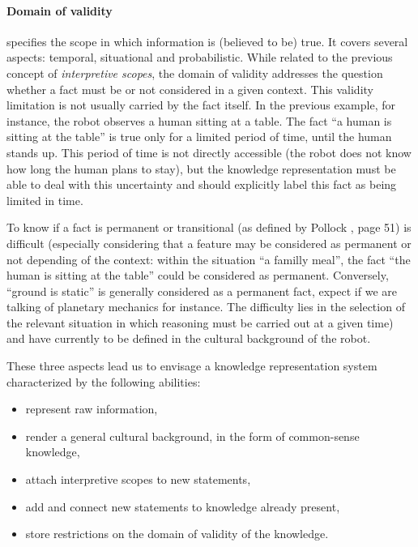 \paragraph{Domain of validity} specifies the scope in which
 information is (believed to be) true. It covers several aspects: temporal,
situational and probabilistic. While related to the previous concept of
\emph{interpretive scopes}, the domain of validity addresses the question
whether a fact must be or not considered in a given context. This validity
limitation is not usually carried by the fact itself. In the previous example,
for instance, the robot observes a human sitting at a table.  The fact ``a
human is sitting at the table'' is true only for a limited period of time,
until the human stands up. This period of time is not directly accessible
(the robot does not know how long the human plans to stay), but the
knowledge representation must be able to deal with this uncertainty and
should explicitly label this fact as being limited in time.

To know if a fact is permanent or transitional (as defined by Pollock
\cite{Pollock1998}, page 51) is difficult (especially
considering that a feature may be considered as permanent or not depending of
the context: within the situation ``a familly meal'', the fact ``the human is sitting at the table'' could be
considered as permanent. Conversely, ``ground is static'' is generally
considered as a permanent fact, expect if we are talking of planetary mechanics
for instance. The difficulty lies in the selection of the relevant situation
in which reasoning must be carried out at a given time) and have currently to
be defined in the cultural background of the robot.

These three aspects lead us to envisage a knowledge representation system
characterized by the following abilities: 
\begin{itemize}
	\item represent raw information,
	\item render a general cultural background, in the form of common-sense knowledge,
	\item attach interpretive scopes to new statements,
	\item add and connect new statements to knowledge already present,
	\item store restrictions on the domain of validity of the knowledge.
\end{itemize}

